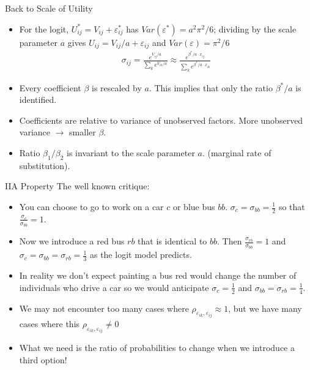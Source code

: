 \documentclass[aspectratio=169,11pt]{beamer}
\begin{document}
\begin{frame}{Back to Scale of Utility}
\begin{itemize}
\item For the logit, $U_{ij}^{*} = V_{ij} + \varepsilon_{ij}^{*}$ has $Var(\varepsilon^{*}) = a^2 \pi^2/6$; dividing by the scale parameter $a$ gives $U_{ij} = V_{ij}/a + \varepsilon_{ij}$ and $Var(\varepsilon) = \pi^2/6$
\begin{eqnarray*}
\sigma_{ij} = \frac{e^{V_{ij}/a}}{\sum_k e^{V_{ik}/a}} \approx \frac{e^{\beta^{*}/a \cdot x_{ij}}}{\sum_k e^{\beta^{*}/a \cdot x_{ik}}}
\end{eqnarray*}
\item Every coefficient $\beta$ is rescaled by $a$. This implies that only the ratio $\beta^{*}/a$ is identified.
\item Coefficients are relative to variance of unobserved factors. More unobserved variance $\longrightarrow$ smaller $\beta$.
\item Ratio $\beta_1/\beta_2$ is invariant to the scale parameter $a$. (\alert{marginal rate of substitution}).
\end{itemize}
\end{frame}


\begin{frame}{IIA Property}
The well known critique:
\begin{itemize}
\item You can choose to go to work on a car $c$ or blue bus $bb$. $\sigma_{c} = \sigma_{bb} = \frac{1}{2}$ so that $\frac{\sigma_c}{\sigma_{bb}} = 1$.
\item Now we introduce a red bus $rb$ that is identical to $bb$. Then $\frac{\sigma_{rb}}{\sigma_{bb}} = 1$ and $\sigma_{c} = \sigma_{bb}= \sigma_{rb} = \frac{1}{3}$ as the logit model predicts.
\item In reality we don't expect painting a bus red would change the number of individuals who drive a car so we would anticipate $\sigma_{c} = \frac{1}{2}$ and $\sigma_{bb} = \sigma_{rb} = \frac{1}{4}$.
\item We may not encounter too many cases where $\rho_{\varepsilon_{ik},\varepsilon_{ij}} \approx 1$, but we have many cases where this $\rho_{\varepsilon_{ik},\varepsilon_{ij}} \neq 0$
\item What we need is the ratio of probabilities to change when we introduce a third option!
\end{itemize}
\end{frame}
\end{document}
